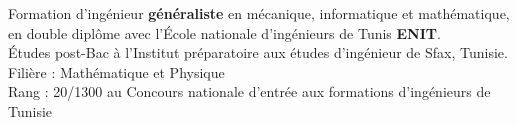 \documentclass[
	a4paper,
]{fortysecondscv}
\begin{document}
\makefrontsidebar

\begin{cvtable}[1.5]
	 {}
{
Formation d'ingénieur \textbf{généraliste} en {mécanique}, {informatique} et mathématique, en {double diplôme} avec l'École nationale d'ingénieurs de Tunis \textbf{ENIT}. 
}
\vspace{-0.5cm}
\\
		{Études post-Bac à l'Institut préparatoire aux études d'ingénieur de Sfax, Tunisie.
  Filière : Mathématique et Physique\\
  {Rang : 20/1300} au Concours nationale d’entrée aux formations d’ingénieurs de Tunisie}
\end{cvtable}
\end{document}
